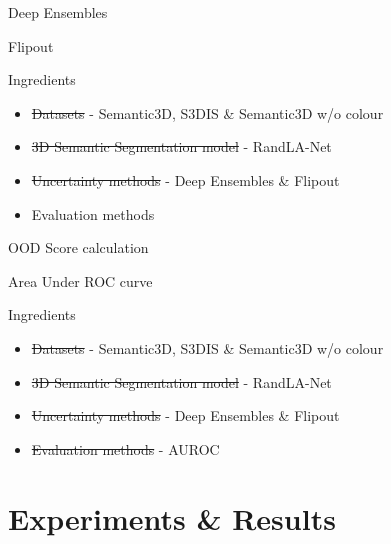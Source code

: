 \documentclass[aspectratio=169]{beamer}
\begin{document}
\begin{frame}{Deep Ensembles}
    
\end{frame}
\begin{frame}{Flipout}
    
\end{frame}
\begin{frame}{Ingredients}
    \begin{itemize}
        \item \st{Datasets} - Semantic3D, S3DIS \& Semantic3D w/o colour
        \item \st{3D Semantic Segmentation model} - RandLA-Net
        \item \st{Uncertainty methods} - Deep Ensembles \& Flipout
        \item Evaluation methods
    \end{itemize}
\end{frame}
\begin{frame}{OOD Score calculation}
    
\end{frame}
\begin{frame}{Area Under ROC curve}
    
\end{frame}
\begin{frame}{Ingredients}
    \begin{itemize}
        \item \st{Datasets} - Semantic3D, S3DIS \& Semantic3D w/o colour
        \item \st{3D Semantic Segmentation model} - RandLA-Net
        \item \st{Uncertainty methods} - Deep Ensembles \& Flipout
        \item \st{Evaluation methods} - AUROC
    \end{itemize}
\end{frame}
\section{Experiments \& Results}
\end{document}
